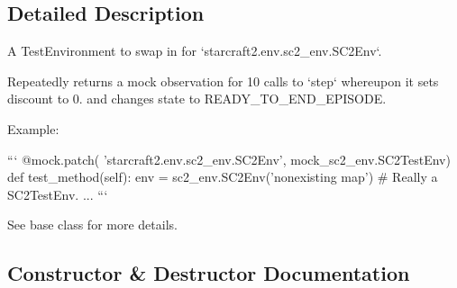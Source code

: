 \subsection{Detailed Description}
\begin{DoxyVerb}A TestEnvironment to swap in for `starcraft2.env.sc2_env.SC2Env`.

Repeatedly returns a mock observation for 10 calls to `step` whereupon it
sets discount to 0. and changes state to READY_TO_END_EPISODE.

Example:

```
@mock.patch(
    'starcraft2.env.sc2_env.SC2Env',
    mock_sc2_env.SC2TestEnv)
def test_method(self):
  env = sc2_env.SC2Env('nonexisting map')  # Really a SC2TestEnv.
  ...
```

See base class for more details.
\end{DoxyVerb}
 

\subsection{Constructor \& Destructor Documentation}
\mbox{\label{classpysc2_1_1env_1_1mock__sc2__env_1_1_s_c2_test_env_a1b3b490081a13ad71d95e11ea649c467}} 
